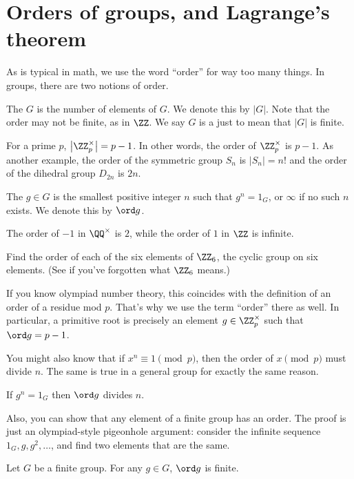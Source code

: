 \section{Orders of groups, and Lagrange's theorem}

As is typical in math, we use the word ``order'' for way too many things.
In groups, there are two notions of order.
\begin{definition}
	The  $G$ is the number of elements of $G$.
	We denote this by $\left\lvert G \right\rvert$.
	Note that the order may not be finite, as in $\ZZ$.
	We say $G$ is a  just to mean that $\left\lvert G \right\rvert$ is finite.
\end{definition}
\begin{example}
	For a prime $p$, $\left\lvert \Zm p \right\rvert = p-1$.
	In other words, the order of $\Zm p$ is $p-1$.
	As another example,
	the order of the symmetric group $S_n$ is $\left\lvert S_n \right\rvert = n!$
	and the order of the dihedral group $D_{2n}$ is $2n$.
\end{example}

\begin{definition}
	The  $g \in G$ is the smallest positive integer $n$
	such that $g^n = 1_G$, or $\infty$ if no such $n$ exists.
	We denote this by $\ord g$.
\end{definition}
\begin{example}
	The order of $-1$ in $\QQ^\times$ is $2$,
	while the order of $1$ in $\ZZ$ is infinite.
\end{example}
\begin{ques}
	Find the order of each of the six elements of $\Zc 6$,
	the cyclic group on six elements.
	(See  if you've forgotten what $\Zc 6$ means.)
\end{ques}
\begin{example}
	If you know olympiad number theory, this coincides with the definition of an order of a residue mod $p$.
	That's why we use the term ``order'' there as well.
	In particular, a primitive root is precisely an element $g \in \Zm p$
	such that $\ord g = p-1$.
\end{example}
You might also know that if $x^n \equiv 1 \pmod p$,
then the order of $x \pmod p$ must divide $n$.
The same is true in a general group for exactly the same reason.
\begin{fact}
	If $g^n = 1_G$ then $\ord g$ divides $n$.
\end{fact}
Also, you can show that any element of a finite group has an order.
The proof is just an olympiad-style pigeonhole argument: consider the infinite sequence $1_G, g, g^2, \dots$, and find two elements that are the same.
\begin{fact}
	Let $G$ be a finite group.
	For any $g \in G$, $\ord g$ is finite.
\end{fact}

